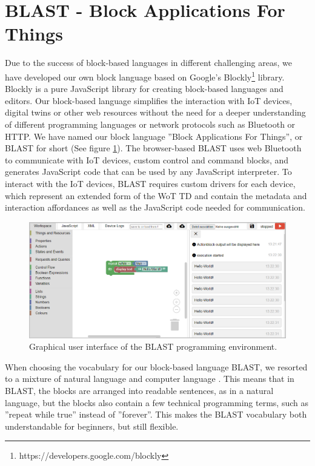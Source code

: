 \documentclass[runningheads]{llncs}
\begin{document}
\section{BLAST - Block Applications For Things}
Due to the success of block-based languages in different challenging areas, we have developed our own block language based on Google's Blockly\footnote{https://developers.google.com/blockly} library.
Blockly is a pure JavaScript library for creating block-based languages and editors.
Our block-based language simplifies the interaction with IoT devices, digital twins or other web resources without the need for a deeper understanding of different programming languages or network protocols such as Bluetooth or HTTP.
We have named our block language ''Block Applications For Things'', or BLAST for short (See figure \ref{fig1}).
The browser-based BLAST uses web Bluetooth to communicate with IoT devices, custom control and command blocks, and generates JavaScript code that can be used by any JavaScript interpreter.
To interact with the IoT devices, BLAST requires custom drivers for each device, which represent an extended form of the WoT TD and contain the metadata and interaction affordances as well as the JavaScript code needed for communication.

\begin{figure}
\includegraphics[width=\textwidth]{BL2.PNG}
\caption{Graphical user interface of the BLAST programming environment.} \label{fig1}
\end{figure}

When choosing the vocabulary for our block-based language BLAST, we resorted to a mixture of natural language and computer language \cite{8120404}.
This means that in BLAST, the blocks are arranged into readable sentences, as in a natural language, but the blocks also contain a few technical programming terms, such as ''repeat while true'' instead of ''forever''.
This makes the BLAST vocabulary both understandable for beginners, but still flexible.
\end{document}
